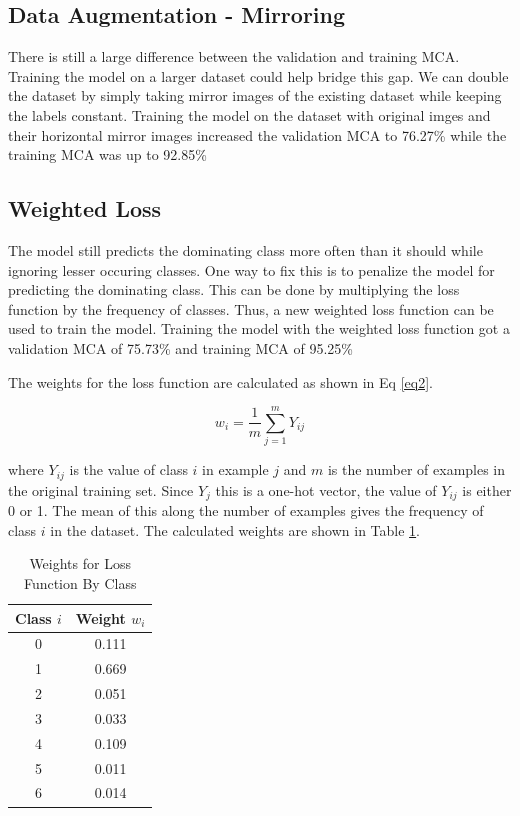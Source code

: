 \documentclass[conference]{IEEEtran}
\begin{document}
\subsection{Data Augmentation -
Mirroring}\label{data-augmentation---mirroring}

There is still a large difference between the validation and training
MCA. Training the model on a larger dataset could help bridge this gap.
We can double the dataset by simply taking mirror images \cite{NIPS2012_4824} of the
existing dataset while keeping the labels constant. Training the model on the dataset with original imges and their horizontal mirror images increased the validation MCA to 76.27\% while the training MCA was up to 92.85\%

\subsection{Weighted Loss}\label{weighted-loss}

The model still predicts the dominating class more often than it should
while ignoring lesser occuring classes. One way to fix this is to
penalize the model for predicting the dominating class.\cite{ronneberger2015u} This can
be done by multiplying the loss function by the frequency of classes.
Thus, a new weighted loss function can be used to train the model.
Training the model with the weighted loss function got a validation MCA
of 75.73\% and training MCA of 95.25\%

The weights for the loss function are calculated as shown in Eq \ref{eq2}.

\begin{equation}
w_i = \frac{1}{m}\sum_{j=1}^{m}Y_{ij}
\label{eq2}
\end{equation}

where $Y_{ij}$ is the value of class $i$ in example $j$ and $m$ is the number of examples in the original training set. Since $Y_j$ this is a one-hot vector, the value of $Y_{ij}$ is either 0 or 1. The mean of this along the number of examples gives the frequency of class $i$ in the dataset. The calculated weights are shown in Table \ref{tab2}.

\begin{table}[htbp]
\caption{Weights for Loss Function By Class}
\begin{center}
\begin{tabular}{|c|c|}
\hline
\textbf{Class $i$} & \textbf{Weight $w_i$}\\
\hline
0 & 0.111\\
\hline
1 & 0.669\\
\hline
2 & 0.051\\
\hline
3 & 0.033\\
\hline
4 & 0.109\\
\hline
5 & 0.011\\
\hline
6 & 0.014\\
\hline
\end{tabular}
\label{tab2}
\end{center}
\end{table}
\end{document}
